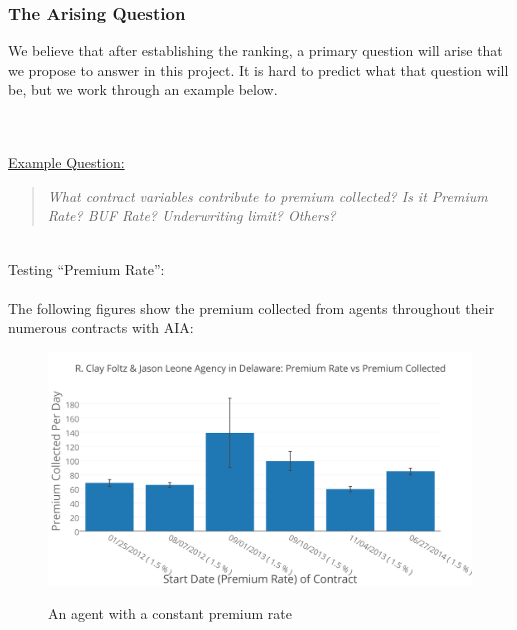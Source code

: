 \documentclass{article}
\begin{document}
\subsubsection{The Arising Question}

We believe that after establishing the ranking, a primary question will arise that we propose to answer 
in this project. It is hard to predict what that question will be, but we work through an example below.  

~\\
~\\
\underline{Example Question:}
\begin{center}
\begin{quote}
\textit{What contract variables contribute to premium collected? Is it Premium Rate? BUF Rate? Underwriting limit? Others?}
\end{quote}
\end{center}

~\\
Testing ``Premium Rate'':
~\\
~\\
The following figures show the premium collected from agents throughout their numerous contracts with AIA:

\begin{figure}[H]
\begin{center}
\includegraphics[width=.5\textwidth]{R_Clay_Foltz_&_Jason_Leone_Agency_in_Delaware-_Premium_Rate_vs_Premium_Collected.png}\\
\caption{An agent with a constant premium rate}
\end{center}
\end{figure}
\end{document}
